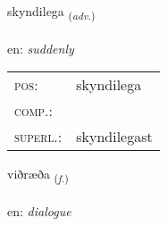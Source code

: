 \documentclass[frontgrid, backgrid]{flacards}\usepackage[]{graphicx}\usepackage[]{color}
\begin{document}
\renewcommand{\flhead}{\vskip5pt \fboxsep=0pt {\small\bfseries\footnotesize Atviksorð | Adverb}}
\renewcommand{\fcfoot}{\vskip5pt \fboxsep=0pt \hspace{2pt}{\small\bfseries\footnotesize 2K}}

\renewcommand{\blhead}{\vskip5pt {\small\bfseries\footnotesize Atviksorð | Adverb }}
\renewcommand{\bcfoot}{\vskip5pt \hspace{2pt}{\small\bfseries\footnotesize 2K}}


{skyndilega \small{\textsubscript{(\textit{adv.})}} \\[1ex] %
\textphonetic{[scɪntɪlɛɣa]} \\
en: \emph{suddenly} \\  [2ex]
\renewcommand*{\arraystretch}{0.8}
\begin{tabular}{ll}
\textsc{pos}: & skyndilega \\ 
\textsc{comp.}: &  \\ 
\textsc{superl.}: & skyndilegast \\
\end{tabular}
}

\renewcommand{\flhead}{\vskip5pt \fboxsep=0pt {\small\bfseries\footnotesize Nafnorð | Noun}}
\renewcommand{\fcfoot}{\vskip5pt \fboxsep=0pt \hspace{2pt}{\small\bfseries\footnotesize 2K}}

\renewcommand{\blhead}{\vskip5pt {\small\bfseries\footnotesize Nafnorð | Noun }}
\renewcommand{\bcfoot}{\vskip5pt \hspace{2pt}{\small\bfseries\footnotesize 2K}}


{viðræða \small{\textsubscript{(\textit{f.})}} \\[1ex] %
\textphonetic{[vɪðraiða]} \\
en: \emph{dialogue} \\  [2ex]
\renewcommand*{\arraystretch}{0.8}
}
\end{document}
